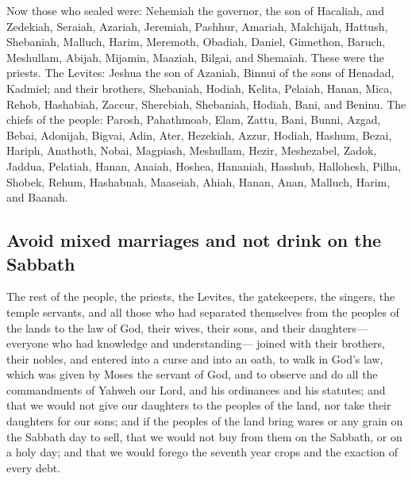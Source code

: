  Now those who sealed were: Nehemiah the governor, the son
of Hacaliah, and Zedekiah,  Seraiah, Azariah, Jeremiah,
 Pashhur, Amariah, Malchijah,  Hattush,
Shebaniah, Malluch,  Harim, Meremoth, Obadiah,
 Daniel, Ginnethon, Baruch,  Meshullam,
Abijah, Mijamin,  Maaziah, Bilgai, and Shemaiah. These
were the priests.  The Levites: Jeshua the son of Azaniah,
Binnui of the sons of Henadad, Kadmiel;  and their
brothers, Shebaniah, Hodiah, Kelita, Pelaiah, Hanan, 
Mica, Rehob, Hashabiah,  Zaccur, Sherebiah, Shebaniah,
 Hodiah, Bani, and Beninu.  The chiefs of
the people: Parosh, Pahathmoab, Elam, Zattu, Bani, 
Bunni, Azgad, Bebai,  Adonijah, Bigvai, Adin,
 Ater, Hezekiah, Azzur,  Hodiah, Hashum,
Bezai,  Hariph, Anathoth, Nobai, 
Magpiash, Meshullam, Hezir,  Meshezabel, Zadok, Jaddua,
 Pelatiah, Hanan, Anaiah,  Hoshea,
Hananiah, Hasshub,  Hallohesh, Pilha, Shobek,
 Rehum, Hashabnah, Maaseiah,  Ahiah,
Hanan, Anan,  Malluch, Harim, and Baanah.

\hypertarget{avoid-mixed-marriages-and-not-drink-on-the-sabbath}{%
\subsection{Avoid mixed marriages and not drink on the
Sabbath}\label{avoid-mixed-marriages-and-not-drink-on-the-sabbath}}

 The rest of the people, the priests, the Levites, the
gatekeepers, the singers, the temple servants, and all those who had
separated themselves from the peoples of the lands to the law of God,
their wives, their sons, and their daughters---everyone who had
knowledge and understanding---  joined with their
brothers, their nobles, and entered into a curse and into an oath, to
walk in God's law, which was given by Moses the servant of God, and to
observe and do all the commandments of Yahweh our Lord, and his
ordinances and his statutes;  and that we would not give
our daughters to the peoples of the land, nor take their daughters for
our sons;  and if the peoples of the land bring wares or
any grain on the Sabbath day to sell, that we would not buy from them on
the Sabbath, or on a holy day; and that we would forego the seventh year
crops and the exaction of every debt.

